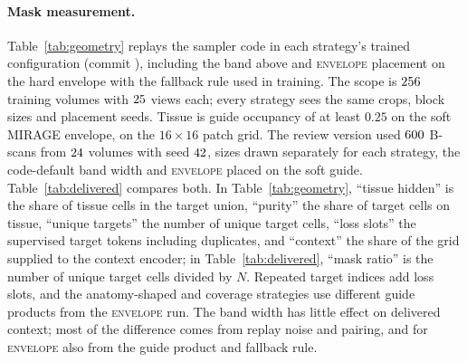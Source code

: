 \paragraph{Mask measurement.}
\label{app:geomprov}
Table~\ref{tab:geometry} replays the sampler code in each strategy's trained
configuration (commit {\footnotesize\texttt{\CRSamplerCommit}}), including
the \ArmBest{} band above and \textsc{envelope} placement on the hard envelope
with the fallback rule used in training. The scope is $256$
training volumes with $25$ views each; every strategy sees the same
crops, block sizes and placement seeds. Tissue is guide occupancy of at least
$0.25$ on the soft MIRAGE envelope, on the $16\times16$ patch grid. The
review version used $600$ B-scans from $24$ volumes with
seed $42$, sizes drawn separately for each strategy, the code-default
\ArmBest{} band width and \textsc{envelope} placed on the soft guide.
Table~\ref{tab:delivered} compares both. In Table~\ref{tab:geometry},
``tissue hidden'' is the share of tissue cells in the target union, ``purity''
the share of target cells on tissue, ``unique targets'' the number of unique
target cells, ``loss slots'' the supervised target tokens including
duplicates, and ``context'' the share of the grid supplied to the context
encoder; in Table~\ref{tab:delivered}, ``mask ratio'' is the number of unique
target cells divided by $N$. Repeated target indices add loss slots, and the
anatomy-shaped and coverage strategies use different guide products from the
\textsc{envelope} run. The band width has little effect on
delivered context; most of the difference comes from replay noise and
pairing, and for \textsc{envelope} also from the guide product and fallback
rule.

